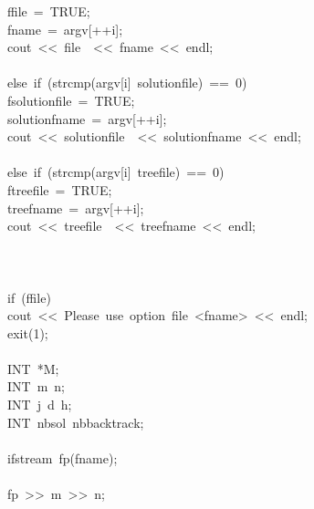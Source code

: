 \begin{tabbing}
\>\>\>ffile\ =\ TRUE;\\[0pt]
\>\>\>fname\ =\ argv[++i];\\[0pt]
\>\>\>cout\ <<\ file\ \ <<\ fname\ <<\ endl;\\[0pt]
\>\>\>\\[0pt]
\>\>else\ if\ (strcmp(argv[i]\ solutionfile)\ ==\ 0)\ \\[0pt]
\>\>\>fsolutionfile\ =\ TRUE;\\[0pt]
\>\>\>solutionfname\ =\ argv[++i];\\[0pt]
\>\>\>cout\ <<\ solutionfile\ \ <<\ solutionfname\ <<\ endl;\\[0pt]
\>\>\>\\[0pt]
\>\>else\ if\ (strcmp(argv[i]\ treefile)\ ==\ 0)\ \\[0pt]
\>\>\>ftreefile\ =\ TRUE;\\[0pt]
\>\>\>treefname\ =\ argv[++i];\\[0pt]
\>\>\>cout\ <<\ treefile\ \ <<\ treefname\ <<\ endl;\\[0pt]
\>\>\>\\[0pt]
\>\>\\[0pt]
\>\\[0pt]
\>if\ (ffile)\ \\[0pt]
\>\>cout\ <<\ Please\ use\ option\ file\ <fname>\ <<\ endl;\\[0pt]
\>\>exit(1);\\[0pt]
\>\>\\[0pt]
\>INT\ *M;\\[0pt]
\>INT\ m\ n;\\[0pt]
\>INT\ j\ d\ h;\\[0pt]
\>INT\ nbsol\ nbbacktrack;\\[0pt]
\>\\[0pt]
\>\>ifstream\ fp(fname);\\[0pt]
\\[0pt]
\>\>fp\ >>\ m\ >>\ n;\\[0pt]
\\[0pt]

\end{tabbing}
